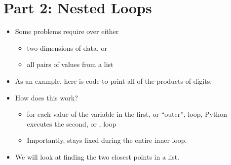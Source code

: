 \documentclass[letterpaper,10pt,english]{sphinxmanual}
\begin{document}
\section{Part 2: Nested Loops}
\label{\detokenize{lecture_notes/lec12_loops2_for_double:part-2-nested-loops}}\begin{itemize}
\item {} 
Some problems require  over either
\begin{itemize}
\item {} 
two dimensions of data, or

\item {} 
all pairs of values from a list

\end{itemize}

\item {} 
As an example, here is code to print all of the products of digits:

%
\begin{sphinxVerbatim}[commandchars=\\\{\}]
  
   
       
\end{sphinxVerbatim}

\item {} 
How does this work?
\begin{itemize}
\item {} 
for each value of  the variable in the first, or “outer”,
loop, Python executes the  second, or , loop

\item {} 
Importantly,  stays fixed during the entire inner loop.

\end{itemize}

\item {} 
We will look at finding the two closest points in a list.

\end{itemize}
\end{document}
